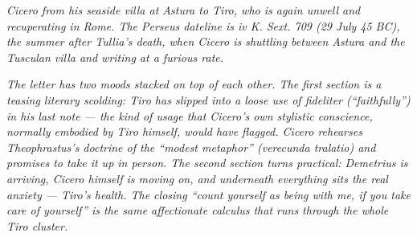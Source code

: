 
\textit{Cicero from his seaside villa at Astura to Tiro, who is again
unwell and recuperating in Rome. The Perseus dateline is iv K. Sext.
709 (29 July 45 BC), the summer after Tullia's death, when Cicero is
shuttling between Astura and the Tusculan villa and writing at a
furious rate.}

\textit{The letter has two moods stacked on top of each other. The
first section is a teasing literary scolding: Tiro has slipped into a
loose use of \textit{fideliter} (``faithfully'') in his last note ---
the kind of usage that Cicero's own stylistic conscience, normally
embodied by Tiro himself, would have flagged. Cicero rehearses
Theophrastus's doctrine of the ``modest metaphor'' (\textit{verecunda
tralatio}) and promises to take it up in person. The second section
turns practical: Demetrius is arriving, Cicero himself is moving on,
and underneath everything sits the real anxiety --- Tiro's health.
The closing ``count yourself as being with me, if you take care of
yourself'' is the same affectionate calculus that runs through the
whole Tiro cluster.}
